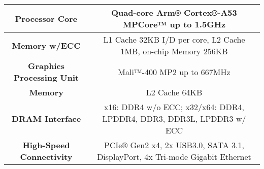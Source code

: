 \begin{tabular}{|c|c|}
\hline
\textbf{Processor Core} & Quad-core Arm® Cortex®-A53 MPCore™ up to 1.5GHz \\
\hline
\textbf{Memory w/ECC} & L1 Cache 32KB I/D per core, L2 Cache 1MB, on-chip Memory 256KB \\
\hline
\textbf{Graphics Processing Unit} & Mali™-400 MP2 up to 667MHz \\
\hline
\textbf{Memory} & L2 Cache 64KB \\
\hline
\textbf{DRAM Interface} & x16: DDR4 w/o ECC; x32/x64: DDR4, LPDDR4, DDR3, DDR3L, LPDDR3 w/ ECC \\
\hline
\textbf{High-Speed Connectivity} & PCIe® Gen2 x4, 2x USB3.0, SATA 3.1, DisplayPort, 4x Tri-mode Gigabit Ethernet \\
\hline
\end{tabular}

